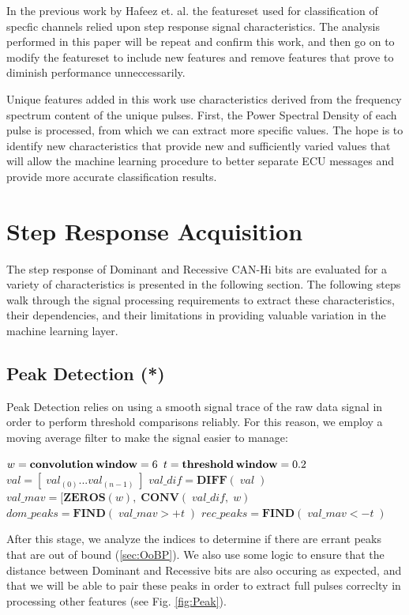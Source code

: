 \documentclass[conference]{IEEEtran}
\begin{document}
In the previous work by Hafeez et. al. \cite{hafeez2019} the featureset used for classification of specfic channels relied upon step response signal characteristics. The analysis performed in this paper will be repeat and confirm this work, and then go on to modify the featureset to include new features and remove features that prove to diminish performance unneccessarily.

Unique features added in this work use characteristics derived from the frequency spectrum content of the unique pulses. First, the Power Spectral Density of each pulse is processed, from which we can extract more specific values. The hope is to identify new characteristics that provide new and sufficiently varied values that will allow the machine learning procedure to better separate ECU messages and provide more accurate classification results.



\section{Step Response Acquisition}

The step response of Dominant and Recessive CAN-Hi bits are evaluated for a variety of characteristics is presented in the following section. The following steps walk through the signal processing requirements to extract these characteristics, their dependencies, and their limitations in providing valuable variation in the machine learning layer.

\subsection{Peak Detection (*)}
Peak Detection relies on using a smooth signal trace of the raw data signal in order to perform threshold comparisons reliably. For this reason, we employ a moving average filter to make the signal easier to manage:
\medbreak
\begin{algorithmic}
\STATE $w = \textbf{convolution\,window} = 6$
\STATE $t = \textbf{threshold\,window} = 0.2$
\STATE $val = [\;val_{(0)} ... val_{(n-1)}\;] $
\STATE $val\_dif = \textbf{DIFF}(\;val\;) $
\STATE $val\_mav = [\textbf{ZEROS}(w),\;\textbf{CONV}(\;val\_dif,\;w) $
\STATE $dom\_peaks = \textbf{FIND}(\;val\_mav > +t\;)$
\STATE $rec\_peaks = \textbf{FIND}(\;val\_mav < -t\;)$
\end{algorithmic}
\medbreak

After this stage, we analyze the indices to determine if there are errant peaks that are out of bound (\ref{sec:OoBP}). We also use some logic to ensure that the distance between Dominant and Recessive bits are also occuring as expected, and that we will be able to pair these peaks in order to extract full pulses correclty in processing other features (see Fig. \ref{fig:Peak}).
\end{document}
